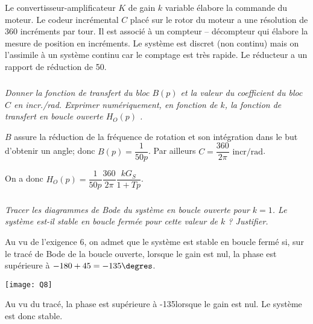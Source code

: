 \begin{multicols}{2}
Le convertisseur-amplificateur $K$ de gain $k$ variable élabore la commande du moteur.
Le codeur incrémental $C$ placé sur le rotor du moteur a une résolution de 360 incréments par tour. Il est associé à un compteur -- décompteur qui élabore la mesure de position en incréments. 
Le système est discret (non continu) mais on l’assimile à un système continu car le comptage est très rapide. 
Le réducteur a un rapport de réduction de 50.
 
\subparagraph{}\textit{Donner la fonction de transfert du bloc $B(p)$ et la valeur du coefficient du bloc $C$ en incr./rad.  
Exprimer numériquement, en fonction de $k$, la fonction de transfert en boucle ouverte $H_O(p)$ .}
\ifprof
\begin{corrige}
$B$ assure la réduction de la fréquence de rotation et son intégration dans le but d'obtenir un angle; donc $B(p)=\dfrac{1}{50p}$.
Par ailleurs $C=\dfrac{360}{2\pi}\text{ incr/rad} $. 

On a donc $H_O(p)=\dfrac{1}{50p}\dfrac{360}{2\pi} \dfrac{kG_S}{1+Tp}$.
\end{corrige}
\else
\fi


\subparagraph{}\textit{Tracer les diagrammes de Bode du système en boucle ouverte pour $k = 1$.
Le système est-il stable en boucle fermée pour cette valeur de $k$ ? Justifier.
} 
\begin{remarque}
Au vu de l'exigence 6, on admet que le système est stable en boucle fermé si, sur le tracé de Bode de la boucle ouverte, lorsque le gain est nul, la phase est supérieure à $-180+45=-135\degres$. 
\end{remarque}

\ifprof
\begin{center}
\texttt{[image: Q8]}
\end{center}
\begin{corrige}
Au vu du tracé, la phase est supérieure à -135\degres lorsque le gain est nul. Le système est donc stable.
\end{corrige}
\else
\fi

% 


\end{multicols}
